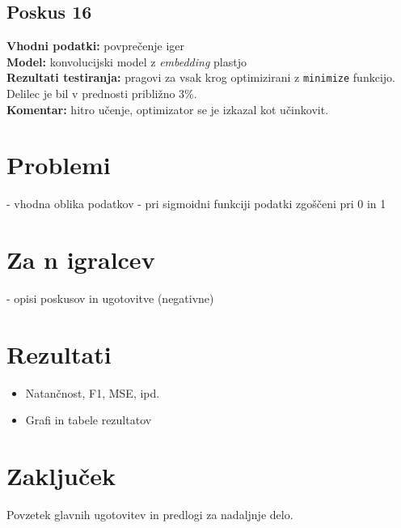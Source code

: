 \documentclass[a4paper,12pt]{article}
\begin{document}
\subsection{Poskus 16}
\textbf{Vhodni podatki:} povprečenje iger \\
\textbf{Model:} konvolucijski model z \textit{embedding} plastjo \\
\textbf{Rezultati testiranja:} pragovi za vsak krog optimizirani z \texttt{minimize} funkcijo. 
Delilec je bil v prednosti približno $3\%$. \\
\textbf{Komentar:} hitro učenje, optimizator se je izkazal kot učinkovit.


\section{Problemi}
- vhodna oblika podatkov
- pri sigmoidni funkciji podatki zgoščeni pri 0 in 1

\section{Za n igralcev}
- opisi poskusov in ugotovitve (negativne)

\section{Rezultati}
\begin{itemize}
    \item Natančnost, F1, MSE, ipd.
    \item Grafi in tabele rezultatov
\end{itemize}

\section{Zaključek}
Povzetek glavnih ugotovitev in predlogi za nadaljnje delo.
\end{document}
